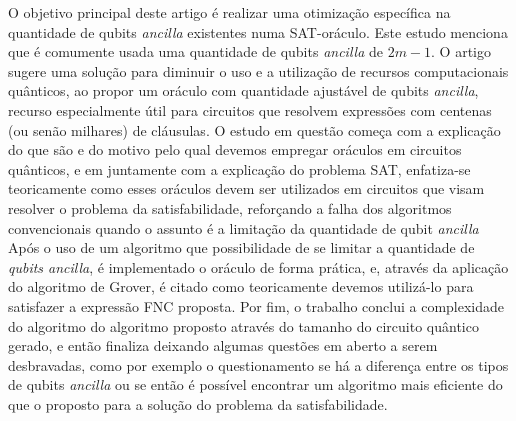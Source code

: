 \documentclass[12pt]{article}
\begin{document}
\cite{yang:23} 
O objetivo principal deste artigo é realizar uma otimização específica na quantidade de qubits \textit{ancilla} existentes numa SAT-oráculo. Este estudo menciona que é comumente usada uma quantidade de qubits \textit{ancilla} de \( 2m - 1 \). O artigo sugere uma solução para diminuir o uso e a utilização de recursos computacionais quânticos, ao propor um oráculo com quantidade ajustável de qubits \textit{ancilla}, recurso especialmente útil para circuitos que resolvem expressões com centenas (ou senão milhares) de cláusulas.
O estudo em questão começa com a explicação do que são e do motivo pelo qual devemos empregar oráculos em circuitos quânticos, e em juntamente com a explicação do problema SAT, enfatiza-se teoricamente como esses oráculos devem ser utilizados em circuitos que visam resolver o problema da satisfabilidade, reforçando a falha dos algoritmos convencionais quando o assunto é a limitação da quantidade de qubit \textit{ancilla}
Após o uso de um algoritmo que possibilidade de se limitar a quantidade de \textit{qubits ancilla}, é implementado o oráculo de forma prática, e, através da aplicação do algoritmo de Grover, é citado como teoricamente devemos utilizá-lo para satisfazer a expressão FNC proposta.
Por fim, o trabalho conclui a complexidade do algoritmo do algoritmo proposto através do tamanho do circuito quântico gerado, e então finaliza deixando algumas questões em aberto a serem desbravadas, como por exemplo o questionamento se há a diferença entre os tipos de qubits \textit{ancilla} ou se então é possível encontrar um algoritmo mais eficiente do que o proposto para a solução do problema da satisfabilidade.
\end{document}
